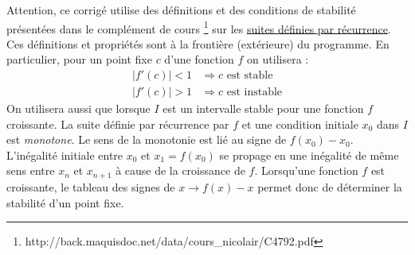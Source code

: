 Attention, ce corrigé utilise des définitions et des conditions de stabilité présentées dans le complément de cours \footnote{http://back.maquisdoc.net/data/cours\_nicolair/C4792.pdf}  sur les \href{http://back.maquisdoc.net/data/cours_nicolair/C4792.pdf}{suites définies par récurrence}. Ces définitions et propriétés sont à la frontière (extérieure) du programme.\newline
En particulier, pour un point fixe $c$ d'une fonction $f$ on utilisera :
\begin{align*}
 |f'(c)|<1 &\Rightarrow c \text{ est stable} \\
 |f'(c)|>1 &\Rightarrow c \text{ est instable} 
\end{align*}
On utilisera aussi que lorsque $I$ est un intervalle stable pour une fonction $f$ croissante. La suite définie par récurrence par $f$ et une condition initiale $x_0$ dans $I$ est \emph{monotone}. Le sens de la monotonie est lié au signe de $f(x_0)-x_0$. L'inégalité initiale entre $x_0$ et $x_1=f(x_0)$ se propage en une inégalité de même sens entre $x_n$ et $x_{n+1}$ à cause de la croissance de $f$.\newline
Lorsqu'une fonction $f$ est croissante, le tableau des signes de $x\rightarrow f(x)-x$ permet donc de déterminer la stabilité d'un point fixe.
